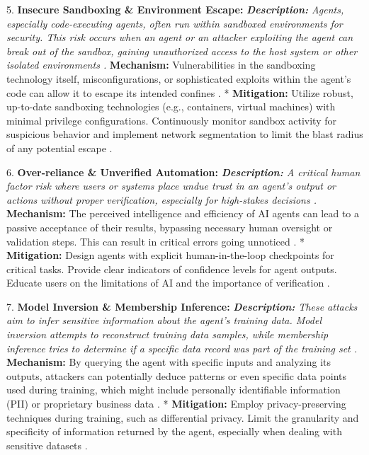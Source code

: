5.  \textbf{Insecure Sandboxing \& Environment Escape:}     \textit{   \textbf{Description:} Agents, especially code-executing agents, often run within sandboxed environments for security. This risk occurs when an agent or an attacker exploiting the agent can break out of the sandbox, gaining unauthorized access to the host system or other isolated environments \cite{Reger2026}.     }   \textbf{Mechanism:} Vulnerabilities in the sandboxing technology itself, misconfigurations, or sophisticated exploits within the agent's code can allow it to escape its intended confines \cite{OWASP2026}.     *   \textbf{Mitigation:} Utilize robust, up-to-date sandboxing technologies (e.g., containers, virtual machines) with minimal privilege configurations. Continuously monitor sandbox activity for suspicious behavior and implement network segmentation to limit the blast radius of any potential escape \cite{Reger2026}.

6.  \textbf{Over-reliance \& Unverified Automation:}     \textit{   \textbf{Description:} A critical human factor risk where users or systems place undue trust in an agent's output or actions without proper verification, especially for high-stakes decisions \cite{Reger2026}.     }   \textbf{Mechanism:} The perceived intelligence and efficiency of AI agents can lead to a passive acceptance of their results, bypassing necessary human oversight or validation steps. This can result in critical errors going unnoticed \cite{OWASP2026}.     *   \textbf{Mitigation:} Design agents with explicit human-in-the-loop checkpoints for critical tasks. Provide clear indicators of confidence levels for agent outputs. Educate users on the limitations of AI and the importance of verification \cite{Reger2026}.

7.  \textbf{Model Inversion \& Membership Inference:}     \textit{   \textbf{Description:} These attacks aim to infer sensitive information about the agent's training data. Model inversion attempts to reconstruct training data samples, while membership inference tries to determine if a specific data record was part of the training set \cite{Reger2026}.     }   \textbf{Mechanism:} By querying the agent with specific inputs and analyzing its outputs, attackers can potentially deduce patterns or even specific data points used during training, which might include personally identifiable information (PII) or proprietary business data \cite{OWASP2026}.     *   \textbf{Mitigation:} Employ privacy-preserving techniques during training, such as differential privacy. Limit the granularity and specificity of information returned by the agent, especially when dealing with sensitive datasets \cite{Reger2026}.

